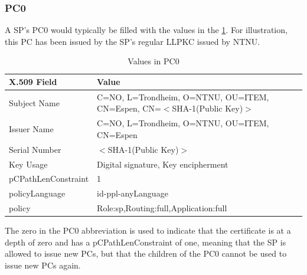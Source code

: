 \subsubsection*{\acl{PC0}}
A \acl{SP}'s \acf{PC0} would typically be filled with the values in the
\ref{tab:pc0_values}. For illustration, this \ac{PC} has been issued by the
\ac{SP}'s regular \ac{LLPKC} issued by NTNU.
\begin{table}[h]
	\begin{tabularx}{\linewidth}{ | l | X |}
		\hline
 		\textbf{X.509 Field} & \textbf{Value}\\\hline
		Subject Name & C=NO, L=Trondheim, O=NTNU, OU=ITEM, CN=Espen, CN=$<$SHA-1(Public Key)$>$ \\\hline
		Issuer Name & C=NO, L=Trondheim, O=NTNU, OU=ITEM, CN=Espen \\\hline 
		Serial Number & $<$SHA-1(Public Key)$>$ \\\hline 
		Key Usage & Digital signature, Key encipherment \\\hline 
		pCPathLenConstraint & 1 \\\hline 
		policyLanguage & id-ppl-anyLanguage \\\hline 
		policy & Role:sp,Routing:full,Application:full \\\hline 
	\end{tabularx}
	\caption{Values in \acf{PC0}}
	\label{tab:pc0_values}
\end{table}
The zero in the PC0 abbreviation is used to indicate that the certificate is at
a depth of zero and has a pCPathLenConstraint of one, meaning that the \ac{SP}
is allowed to issue new \acp{PC}, but that the children of the \ac{PC0} cannot
be used to issue new \acp{PC} again.

